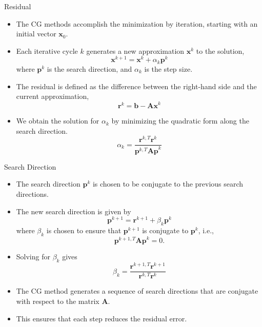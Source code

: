 \documentclass{beamer}
\begin{document}
\begin{frame}{Residual}
\begin{itemize}
    \item  The CG methods accomplish the minimization by iteration, starting with an
    initial vector $\mathbf{x}_0$.
    \item Each iterative cycle $k$ generates a new approximation $\mathbf{x}^k$ to the solution, 
    \[
    \mathbf{x}^{k+1}=\mathbf{x}^k+\alpha_k \mathbf{p}^k
    \]
    where $\mathbf{p}^k$ is the search direction, and $\alpha_k$ is the step size.
    \item The residual is defined as the difference between the right-hand side and the current approximation,
    \[
    \mathbf{r}^k=\mathbf{b}-\mathbf{A x}^k
    \] 
    \item We obtain the solution for $\alpha_k$ by minimizing the quadratic form along the search direction.
    \[
    \alpha_k=\frac{\mathbf{r}^{k,T}  \mathbf{r}^k}{\mathbf{p}^{k,T} \mathbf{A p}^k}
    \]
\end{itemize}
\end{frame}
\begin{frame}{Search Direction}
    \begin{itemize}
        \item The search direction $\mathbf{p}^k$ is chosen to be conjugate to the previous search directions.
        \item The new search direction is given by
        \[
        \mathbf{p}^{k+1}=\mathbf{r}^{k+1}+\beta_k \mathbf{p}^k
        \]
        where $\beta_k$ is chosen to ensure that $\mathbf{p}^{k+1}$ is conjugate to $\mathbf{p}^k$, i.e.,
        \[
        \mathbf{p}^{k+1,T} \mathbf{A p}^k=0.
        \]
        \item Solving for $\beta_k$ gives
        \[
        \beta_k=\frac{\mathbf{r}^{k+1,T} \mathbf{r}^{k+1}}{\mathbf{r}^{k,T} \mathbf{r}^k}
        \]
        \item The CG method generates a sequence of search directions that are conjugate with respect to the matrix $\mathbf{A}$.
        \item This ensures that each step reduces the residual error.
    \end{itemize}

\end{frame}
\end{document}
